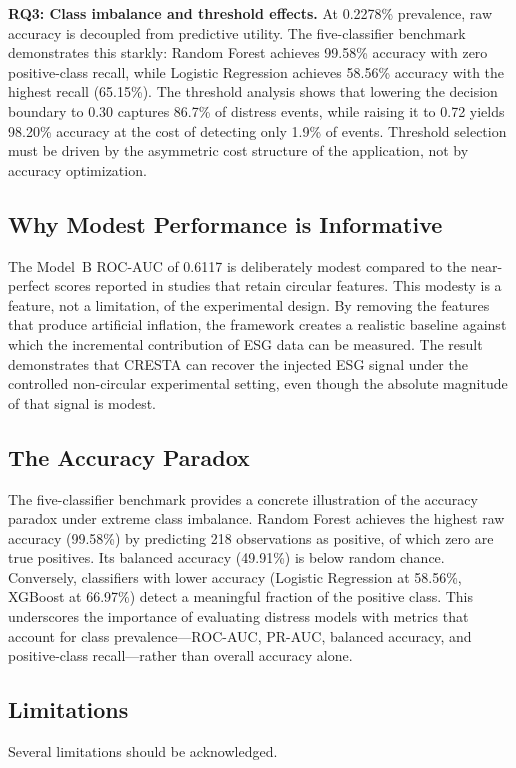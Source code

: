 \documentclass[sigconf,anonymous]{acmart}
\begin{document}
\textbf{RQ3: Class imbalance and threshold effects.}
At 0.2278\% prevalence, raw accuracy is decoupled from predictive utility. The five-classifier benchmark demonstrates this starkly: Random Forest achieves 99.58\% accuracy with zero positive-class recall, while Logistic Regression achieves 58.56\% accuracy with the highest recall (65.15\%). The threshold analysis shows that lowering the decision boundary to 0.30 captures 86.7\% of distress events, while raising it to 0.72 yields 98.20\% accuracy at the cost of detecting only 1.9\% of events. Threshold selection must be driven by the asymmetric cost structure of the application, not by accuracy optimization.

\subsection{Why Modest Performance is Informative}
The Model~B ROC-AUC of 0.6117 is deliberately modest compared to the near-perfect scores reported in studies that retain circular features. This modesty is a feature, not a limitation, of the experimental design. By removing the features that produce artificial inflation, the framework creates a realistic baseline against which the incremental contribution of ESG data can be measured. The result demonstrates that CRESTA can recover the injected ESG signal under the controlled non-circular experimental setting, even though the absolute magnitude of that signal is modest.

\subsection{The Accuracy Paradox}
The five-classifier benchmark provides a concrete illustration of the accuracy paradox under extreme class imbalance. Random Forest achieves the highest raw accuracy (99.58\%) by predicting 218 observations as positive, of which zero are true positives. Its balanced accuracy (49.91\%) is below random chance. Conversely, classifiers with lower accuracy (Logistic Regression at 58.56\%, XGBoost at 66.97\%) detect a meaningful fraction of the positive class. This underscores the importance of evaluating distress models with metrics that account for class prevalence---ROC-AUC, PR-AUC, balanced accuracy, and positive-class recall---rather than overall accuracy alone.

\subsection{Limitations}
Several limitations should be acknowledged.
\end{document}
